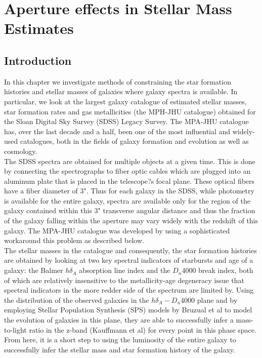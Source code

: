 \chapter{Aperture effects in Stellar Mass Estimates}

\label{ch:acm}
\newpage

\section{Introduction}

In this chapter we investigate methods of constraining the star formation histories and stellar masses of galaxies where galaxy spectra is available. In particular, we look at the largest galaxy catalogue of estimated stellar masses, star formation rates and gas metallicities (the MPH-JHU catalogue) obtained for the Sloan Digital Sky Survey (SDSS) Legacy Survey. The MPA-JHU catalogue has, over the last decade and a half, been one of the most influential and widely-used catalogues, both in the fields of galaxy formation and evolution as well as cosmology.\\
The SDSS spectra are obtained for multiple objects at a given time. This is done by connecting the spectrographs to fiber optic cables which are plugged into an aluminum plate that is placed in the telescope?s focal plane. These optical fibers have a fiber diameter of $3$". Thus for each galaxy in the SDSS, while photometry is available for the entire galaxy, spectra are available only for the region of the galaxy contained within this $3$" transverse angular distance and thus the fraction of the galaxy falling within the aperture may vary widely with the redshift of this galaxy. The MPA-JHU catalogue was developed by using a sophisticated workaround this problem as described below.\\
The stellar masses in the catalogue and consequently, the star formation histories are obtained by looking at two key spectral indicators of starbursts and age of a galaxy: the Balmer $h\delta_{A}$ absorption line index and the $D_{n}4000$ break index, both of which are relatively insensitive to the metallicity-age degeneracy issue that spectral indicators in the more redder side of the spectrum are limited by. Using the distribution of the observed galaxies in the $h\delta_{A}-D_{n}4000$ plane and by employing Stellar Population Synthesis (SPS) models by Bruzual et al to model the evolution of galaxies in this plane, they are able to successfully infer a mass-to-light ratio in the z-band (Kauffmann et al) for every point in this phase space. From here, it is a short step to using the luminosity of the entire galaxy to successfully infer the stellar mass and star formation history of the galaxy.\\
